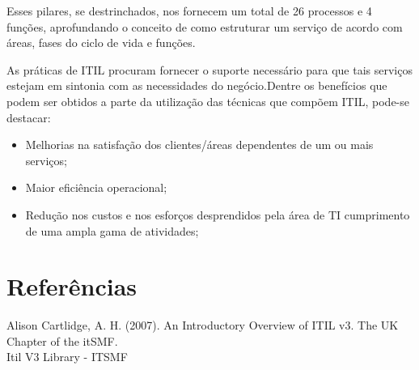 \documentclass[11pt,a4paper]{article}
\begin{document}
Esses pilares, se destrinchados, nos fornecem um total de 26 processos e 4 funções, aprofundando o conceito de como estruturar um serviço de acordo com áreas, fases do ciclo de vida e funções.



As práticas de ITIL procuram fornecer o suporte necessário para que tais serviços estejam em sintonia com as necessidades do negócio.Dentre os benefícios que podem ser obtidos a parte da utilização das técnicas que compõem ITIL, pode-se destacar:


\begin{itemize}[noitemsep]
	\item Melhorias na satisfação dos clientes/áreas dependentes de um ou mais serviços;
	\item Maior eficiência operacional;
	\item Redução nos custos e nos esforços desprendidos pela área de TI cumprimento de uma ampla gama de atividades;
\end{itemize}












\section{Referências}
Alison Cartlidge, A. H. (2007). An Introductory Overview of ITIL v3. The UK Chapter of the itSMF.\\
Itil V3 Library - ITSMF \\
\end{document}
